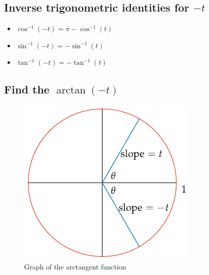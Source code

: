\subsection{Inverse trigonometric identities for $-t$}
\begin{itemize}
    \item $ \cos^{-1}(-t) = \pi - \cos^{-1}(t) $
    \item $ \sin^{-1}(-t) = - \sin^{-1}(t) $
    \item $ \tan^{-1}(-t) = -\tan^{-1}(t) $
\end{itemize}

\subsection{Find the $\arctan(-t)$}
\begin{figure}
    \centering
    \includegraphics[scale=0.4]{pics/23.png}
    \caption{Graph of the arctangent function}
\end{figure}

